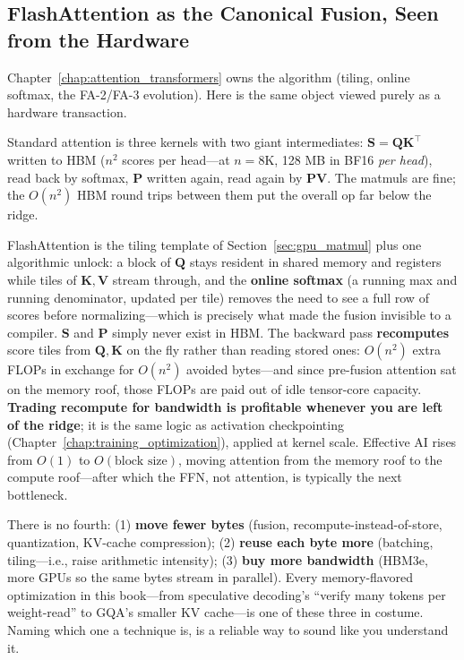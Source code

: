 \subsection{FlashAttention as the Canonical Fusion, Seen from the Hardware}

Chapter~\ref{chap:attention_transformers} owns the algorithm (tiling, online softmax, the FA-2/FA-3 evolution). Here is the same object viewed purely as a hardware transaction.

Standard attention is three kernels with two giant intermediates: $\mathbf{S} = \mathbf{Q}\mathbf{K}^\top$ written to HBM ($n^2$ scores per head---at $n = 8$K, 128 MB in BF16 \textit{per head}), read back by softmax, $\mathbf{P}$ written again, read again by $\mathbf{P}\mathbf{V}$. The matmuls are fine; the $O(n^2)$ HBM round trips between them put the overall op far below the ridge.

FlashAttention is the tiling template of Section~\ref{sec:gpu_matmul} plus one algorithmic unlock: a block of $\mathbf{Q}$ stays resident in shared memory and registers while tiles of $\mathbf{K}, \mathbf{V}$ stream through, and the \textbf{online softmax} (a running max and running denominator, updated per tile) removes the need to see a full row of scores before normalizing---which is precisely what made the fusion invisible to a compiler. $\mathbf{S}$ and $\mathbf{P}$ simply never exist in HBM. The backward pass \textbf{recomputes} score tiles from $\mathbf{Q}, \mathbf{K}$ on the fly rather than reading stored ones: $O(n^2)$ extra FLOPs in exchange for $O(n^2)$ avoided bytes---and since pre-fusion attention sat on the memory roof, those FLOPs are paid out of idle tensor-core capacity. \textbf{Trading recompute for bandwidth is profitable whenever you are left of the ridge}; it is the same logic as activation checkpointing (Chapter~\ref{chap:training_optimization}), applied at kernel scale. Effective AI rises from $O(1)$ to $O(\text{block size})$, moving attention from the memory roof to the compute roof---after which the FFN, not attention, is typically the next bottleneck.

\begin{keyinsight}
There is no fourth: (1) \textbf{move fewer bytes} (fusion, recompute-instead-of-store, quantization, KV-cache compression); (2) \textbf{reuse each byte more} (batching, tiling---i.e., raise arithmetic intensity); (3) \textbf{buy more bandwidth} (HBM3e, more GPUs so the same bytes stream in parallel). Every memory-flavored optimization in this book---from speculative decoding's ``verify many tokens per weight-read'' to GQA's smaller KV cache---is one of these three in costume. Naming which one a technique is, is a reliable way to sound like you understand it.
\end{keyinsight}

